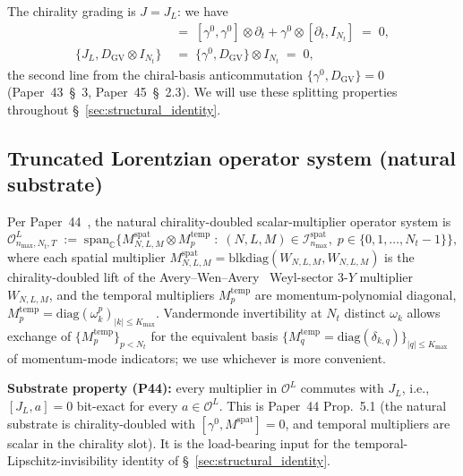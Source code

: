 \documentclass[11pt,a4paper]{article}
\theoremstyle{plain}
\theoremstyle{definition}
\newcommand{\nmax}{n_{\max}}
\newcommand{\Nt}{N_{t}}
\newcommand{\Kmax}{K_{\max}}
\newcommand{\Op}{\mathcal{O}}
\newcommand{\C}{\mathbb{C}}
\newcommand{\DGV}{D_{\mathrm{GV}}}
\newcommand{\JL}{J_{L}}
\newcommand{\spat}{\mathrm{spat}}
\newcommand{\temp}{\mathrm{temp}}
\begin{document}
The chirality grading is $J = \JL$: we have
\begin{align}
   [\JL, \gamma^{0} \otimes \partial_{t}]
      &\;=\; [\gamma^{0}, \gamma^{0}] \otimes \partial_{t} + \gamma^{0} \otimes [\partial_{t}, I_{\Nt}]
      \;=\; 0,
   \label{eq:J_commutes_with_Ddiag} \\
   \{\JL, \DGV \otimes I_{\Nt}\}
      &\;=\; \{\gamma^{0}, \DGV\} \otimes I_{\Nt} \;=\; 0,
   \label{eq:J_anticommutes_with_Doff}
\end{align}
the second line from the chiral-basis anticommutation
$\{\gamma^{0}, \DGV\} = 0$ (Paper~43~\S~3, Paper~45~\S~2.3). We will use
these splitting properties throughout \S~\ref{sec:structural_identity}.

\subsection{Truncated Lorentzian operator system (natural substrate)}
\label{sec:op_system}

Per Paper~44~\cite{paper44}, the natural chirality-doubled scalar-multiplier
operator system is
\begin{equation}\label{eq:op_system_def}
   \Op^{L}_{\nmax,\Nt,T}
   \;:=\; \mathrm{span}_{\C}\bigl\{
            M^{\spat}_{N,L,M} \otimes M^{\temp}_{p}
            \;:\; (N, L, M) \in \mathcal{I}^{\spat}_{\nmax},\;
                  p \in \{0, 1, \ldots, \Nt - 1\}
         \bigr\},
\end{equation}
where each spatial multiplier
$M^{\spat}_{N,L,M} = \mathrm{blkdiag}(W_{N,L,M}, W_{N,L,M})$ is the
chirality-doubled lift of the Avery--Wen--Avery~\cite{paper32}
Weyl-sector $3$-$Y$ multiplier $W_{N,L,M}$, and the temporal
multipliers $M^{\temp}_{p}$ are momentum-polynomial diagonal,
$M^{\temp}_{p} = \mathrm{diag}(\omega_{k}^{p})_{|k| \le \Kmax}$.
Vandermonde invertibility at $\Nt$ distinct $\omega_{k}$ allows
exchange of $\{M^{\temp}_{p}\}_{p < \Nt}$ for the equivalent basis
$\{M^{\temp}_{q} = \mathrm{diag}(\delta_{k, q})\}_{|q| \le \Kmax}$ of
momentum-mode indicators; we use whichever is more convenient.

\textbf{Substrate property (P44):} every multiplier in $\Op^{L}$
commutes with $\JL$, i.e., $[\JL, a] = 0$ bit-exact for every
$a \in \Op^{L}$. This is Paper~44 Prop.~5.1 (the natural substrate
is chirality-doubled with $[\gamma^{0}, M^{\spat}] = 0$, and
temporal multipliers are scalar in the chirality slot). It is the
load-bearing input for the temporal-Lipschitz-invisibility identity of
\S~\ref{sec:structural_identity}.
\end{document}

